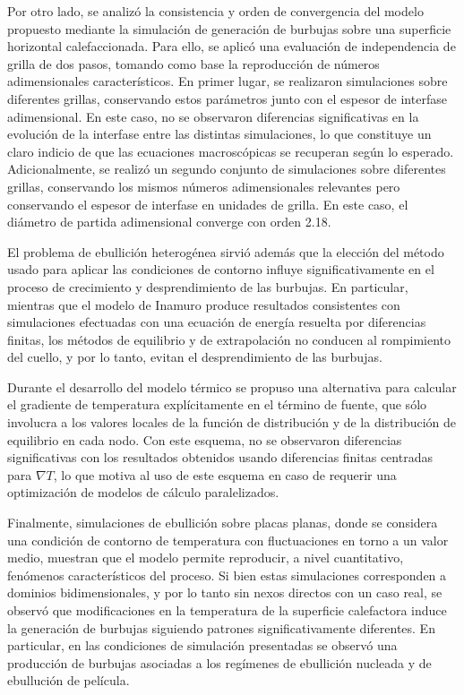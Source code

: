 Por otro lado, se analiz\'o la consistencia y orden de convergencia del modelo propuesto mediante la simulaci\'on de generaci\'on de burbujas sobre una superficie horizontal calefaccionada. Para ello, se aplic\'o una evaluaci\'on de independencia de grilla de dos pasos, tomando como base la reproducci\'on de n\'umeros adimensionales caracter\'isticos. En primer lugar, se realizaron simulaciones sobre diferentes grillas, conservando estos par\'ametros junto con el espesor de interfase adimensional. En este caso, no se observaron diferencias significativas en la evoluci\'on de la interfase entre las distintas simulaciones, lo que constituye un claro indicio de que las ecuaciones macrosc\'opicas se recuperan seg\'un lo esperado. Adicionalmente, se realiz\'o un segundo conjunto de simulaciones sobre diferentes grillas, conservando los mismos n\'umeros adimensionales relevantes pero conservando el espesor de interfase en unidades de grilla. En este caso, el di\'ametro de partida adimensional converge con orden 2.18.

El problema de ebullici\'on heterog\'enea sirvi\'o adem\'as que la elecci\'on del m\'etodo usado para aplicar las condiciones de contorno influye significativamente en el proceso de crecimiento y desprendimiento de las burbujas. En particular, mientras que el modelo de Inamuro produce resultados consistentes con simulaciones efectuadas con una ecuaci\'on de energ\'ia resuelta por diferencias finitas, los m\'etodos de equilibrio y de extrapolaci\'on no conducen al rompimiento del cuello, y por lo tanto, evitan el desprendimiento de las burbujas. 

Durante el desarrollo del modelo t\'ermico se propuso una alternativa para calcular el gradiente de temperatura expl\'icitamente en el t\'ermino de fuente, que s\'olo involucra a los valores locales de la funci\'on de distribuci\'on y de la distribuci\'on de equilibrio en cada nodo. Con este esquema, no se observaron diferencias significativas con los resultados obtenidos usando diferencias finitas centradas para $\nabla T$, lo que motiva al uso de este esquema en caso de requerir una optimizaci\'on de modelos de c\'alculo paralelizados.

Finalmente, simulaciones de ebullici\'on sobre placas planas, donde se considera una condici\'on de contorno de temperatura con fluctuaciones en torno a un valor medio, muestran que el modelo permite reproducir, a nivel cuantitativo, fen\'omenos caracter\'isticos del proceso. Si bien estas simulaciones corresponden a dominios bidimensionales, y por lo tanto sin nexos directos con un caso real, se observ\'o que modificaciones en la temperatura de la superficie calefactora induce la generaci\'on de burbujas siguiendo patrones significativamente diferentes. En particular, en las condiciones de simulaci\'on presentadas se observ\'o una producci\'on de burbujas asociadas a los reg\'imenes de ebullici\'on nucleada y de ebulluci\'on de pel\'icula. 
